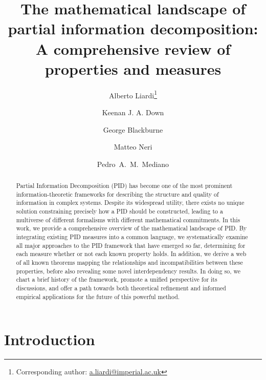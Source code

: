 \documentclass{article}
\title{The mathematical landscape of partial information decomposition: \\ A comprehensive review of properties and measures}
\begin{document}
\author[1]{Alberto Liardi\thanks{Corresponding author: \href{mailto:a.liardi@imperial.ac.uk}{a.liardi@imperial.ac.uk}}}

\author[1,2,3]{Keenan J. A. Down}

\author[4,1]{George Blackburne}

\author[5]{Matteo Neri}

\author[1,6]{\mbox{Pedro A. M. Mediano}}

\date{\vspace{-1.2cm}}

\maketitle

\begin{abstract}
    
Partial Information Decomposition (PID) has become one of the most prominent information-theoretic frameworks for describing the structure and quality of information in complex systems. Despite its widespread utility, there exists no unique solution constraining precisely how a PID should be constructed, leading to a multiverse of different formalisms with different mathematical commitments. In this work, we provide a comprehensive overview of the mathematical landscape of PID. By integrating existing PID measures into a common language, we systematically examine all major approaches to the PID framework that have emerged so far, determining for each measure whether or not each known property holds. In addition, we derive a web of all known theorems mapping the relationships and incompatibilities between these properties, before also revealing some novel interdependency results. 
In doing so, we chart a brief history of the framework, promote a unified perspective for its discussions, and offer a path towards both theoretical refinement and informed empirical applications for the future of this powerful method.
\end{abstract}

\section{Introduction}
\end{document}
